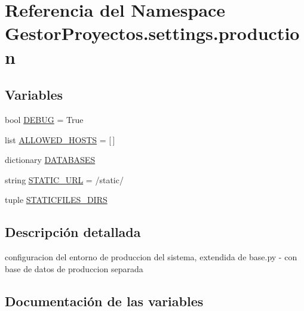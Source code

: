 \hypertarget{namespace_gestor_proyectos_1_1settings_1_1production}{}\section{Referencia del Namespace Gestor\+Proyectos.\+settings.\+production}
\label{namespace_gestor_proyectos_1_1settings_1_1production}
\subsection*{Variables}
\begin{DoxyCompactItemize}
\item 
bool \hyperlink{namespace_gestor_proyectos_1_1settings_1_1production_abd0ae018aa0ff29a3b22393c0cdbfb54}{D\+E\+B\+UG} = True
\item 
list \hyperlink{namespace_gestor_proyectos_1_1settings_1_1production_ae13b1a28db97970095ee64b7e7ac8663}{A\+L\+L\+O\+W\+E\+D\+\_\+\+H\+O\+S\+TS} = \mbox{[}$\,$\mbox{]}
\item 
dictionary \hyperlink{namespace_gestor_proyectos_1_1settings_1_1production_a8cfcda1b42d37da48291029b4343e355}{D\+A\+T\+A\+B\+A\+S\+ES}
\item 
string \hyperlink{namespace_gestor_proyectos_1_1settings_1_1production_a71476a25631b511bc14e5beac309374e}{S\+T\+A\+T\+I\+C\+\_\+\+U\+RL} = \textquotesingle{}/static/\textquotesingle{}
\item 
tuple \hyperlink{namespace_gestor_proyectos_1_1settings_1_1production_abdddc5e88758d68ded15fc9860790ce0}{S\+T\+A\+T\+I\+C\+F\+I\+L\+E\+S\+\_\+\+D\+I\+RS}
\end{DoxyCompactItemize}


\subsection{Descripción detallada}
\begin{DoxyVerb}configuracion del entorno de produccion del sistema, extendida de base.py
- con base de datos de produccion separada
\end{DoxyVerb}
 

\subsection{Documentación de las variables}
